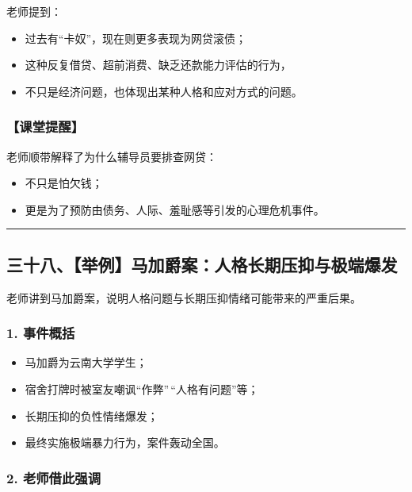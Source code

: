 \documentclass[
  chinese,
  9pt,
  a4paper,
]{ctexart}
\providecommand{\tightlist}{%
  \setlength{\itemsep}{0pt}\setlength{\parskip}{0pt}}
\begin{document}
老师提到：

\begin{itemize}
\tightlist
\item
  过去有``卡奴''，现在则更多表现为网贷滚债；
\item
  这种反复借贷、超前消费、缺乏还款能力评估的行为，
\item
  不只是经济问题，也体现出某种人格和应对方式的问题。
\end{itemize}

\subsubsection{【课堂提醒】}\label{ux8bfeux5802ux63d0ux9192}

老师顺带解释了为什么辅导员要排查网贷：

\begin{itemize}
\tightlist
\item
  不只是怕欠钱；
\item
  更是为了预防由债务、人际、羞耻感等引发的心理危机事件。
\end{itemize}

\begin{center}\rule{0.5\linewidth}{0.5pt}\end{center}

\subsection{三十八、【举例】马加爵案：人格长期压抑与极端爆发}\label{ux4e09ux5341ux516bux4e3eux4f8bux9a6cux52a0ux7235ux6848ux4ebaux683cux957fux671fux538bux6291ux4e0eux6781ux7aefux7206ux53d1}

老师讲到马加爵案，说明人格问题与长期压抑情绪可能带来的严重后果。

\subsubsection{1. 事件概括}\label{ux4e8bux4ef6ux6982ux62ec}

\begin{itemize}
\tightlist
\item
  马加爵为云南大学学生；
\item
  宿舍打牌时被室友嘲讽``作弊''\,``人格有问题''等；
\item
  长期压抑的负性情绪爆发；
\item
  最终实施极端暴力行为，案件轰动全国。
\end{itemize}

\subsubsection{2.
老师借此强调}\label{ux8001ux5e08ux501fux6b64ux5f3aux8c03}
\end{document}
